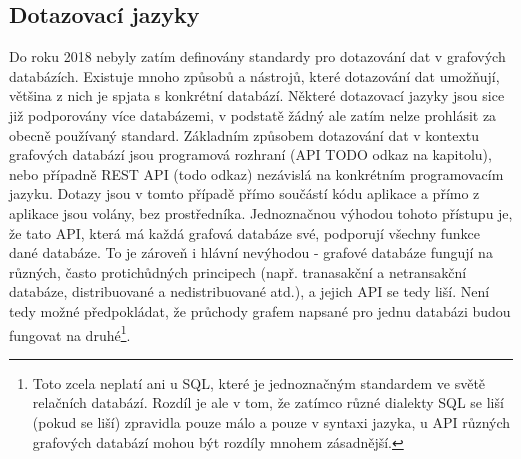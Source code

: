 {%








\subsection{Dotazovací jazyky}

Do roku 2018 nebyly zatím definovány standardy pro dotazování dat v grafových databázích. Existuje mnoho způsobů a nástrojů, které dotazování dat umožňují, většina z nich je spjata s konkrétní databází. Některé dotazovací jazyky jsou sice již podporovány více databázemi, v podstatě žádný ale zatím nelze prohlásit za obecně používaný standard. Základním způsobem dotazování dat v kontextu grafových databází jsou programová rozhraní (API TODO odkaz na kapitolu), nebo případně REST API (todo odkaz) nezávislá na konkrétním programovacím jazyku. Dotazy jsou v tomto případě přímo součástí kódu aplikace a přímo z aplikace jsou volány, bez prostředníka. Jednoznačnou výhodou tohoto přístupu je, že tato API, která má každá grafová databáze své, podporují všechny funkce dané databáze. To je zároveň i hlávní nevýhodou - grafové databáze fungují na různých, často protichůdných principech (např. tranasakční a netransakční databáze, distribuované a nedistribuované atd.), a jejich API se tedy liší. Není tedy možné předpokládat, že průchody grafem napsané pro jednu databázi budou fungovat na druhé\footnote{Toto zcela neplatí ani u SQL, které je jednoznačným standardem ve světě relačních databází. Rozdíl je ale v tom, že zatímco různé dialekty SQL se liší (pokud se liší) zpravidla pouze málo a pouze v syntaxi jazyka, u API různých grafových databází mohou být rozdíly mnohem zásadnější.}.   

}
